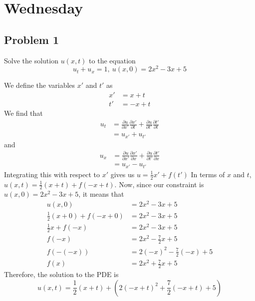 \documentclass{ben}
\begin{document}
\section{Wednesday}
\subsection{Problem 1}
\noindent
Solve the solution $u(x, t)$ to the equation
\[
u_t + u_x = 1,\ u(x, 0) = 2x^2 - 3x + 5
\]
\begin{solution}
    We define the variables $x'$ and $t'$ as
    \begin{align*}
        x' &= x + t\\
        t' &= -x + t
    \end{align*}
    We find that
    \begin{align*}
        u_t &= \frac{\partial u}{\partial x'} \frac{\partial x'}{\partial t}
        + \frac{\partial u}{\partial t'} \frac{\partial t'}{\partial t}\\
        &= u_{x'} + u_{t'}
    \end{align*}
    and
    \begin{align*}
        u_x &= \frac{\partial u}{\partial x'} \frac{\partial x'}{\partial x}
        + \frac{\partial u}{\partial t'} \frac{\partial t'}{\partial x}\\
        &= u_{x'} - u_{t'}
    \end{align*}
    Integrating this with respect to $x'$ gives us $u = \frac{1}{2}x' + f(t')$
    In terms of $x$ and $t$, $u(x, t) = \frac{1}{2} \left( x + t \right) + f\left( -x + t \right)$.
    Now, since our constraint is $u(x, 0) = 2x^2 - 3x + 5$, it means that
    \begin{align*}
        u(x, 0) &= 2x^2 - 3x + 5\\
        \frac{1}{2}(x + 0) + f(-x + 0) &= 2x^2 - 3x + 5\\
        \frac{1}{2} x + f(-x) &= 2x^2 - 3x + 5\\
        f(-x) &= 2x^2 - \frac{7}{2}x + 5\\
        f(-(-x)) &= 2(-x)^2 - \frac{7}{2}(-x) + 5\\
        f(x) &= 2x^2 + \frac{7}{2}x + 5
    \end{align*}
    Therefore, the solution to the PDE is
    \[
        u(x, t) = \frac{1}{2}(x + t) + \left( 2 (-x + t)^2 + \frac{7}{2} (-x + t) + 5 \right)
    \]
\end{solution}
\end{document}
